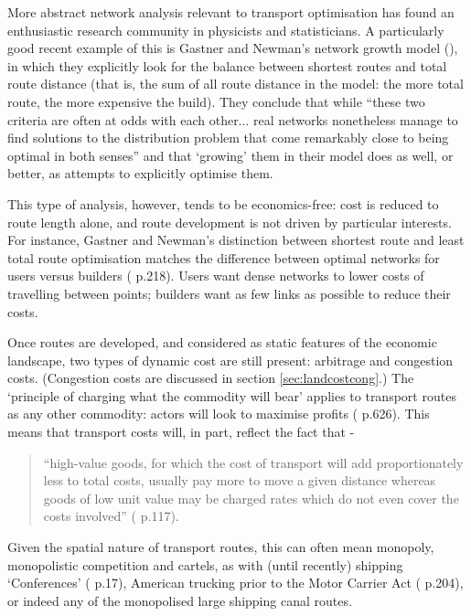 {More abstract network analysis relevant to transport optimisation has found an enthusiastic research community in physicists and statisticians. A particularly good recent example of this is Gastner and Newman's network growth model (\citealt{gastner_shape_2006}), in which they explicitly look for the balance between shortest routes and total route distance (that is, the sum of all route distance in the model: the more total route, the more expensive the build). They conclude that while ``these two criteria are often at odds with each other... real networks nonetheless manage to find solutions to the distribution problem that come remarkably close to being optimal in both senses'' and that `growing' them in their model does as well, or better, as attempts to explicitly optimise them. 

This type of analysis, however, tends to be economics-free: cost is reduced to route length alone, and route development is not driven by particular interests. For instance, Gastner and Newman's distinction between shortest route and least total route optimisation matches the difference between optimal networks for users versus builders (\citealt{haggett_locational_1977} p.218). Users want dense networks to lower costs of travelling between points; builders want as few links as possible to reduce their costs. 

Once routes are developed, and considered as static features of the economic landscape, two types of dynamic cost are still present: arbitrage and congestion costs. (Congestion costs are discussed in section \ref{sec:landcostcong}.) The `principle of charging what the commodity will bear' applies to transport routes as any other commodity: actors will look to maximise profits (\citealt{behrens_changes_2007} p.626). This means that transport costs will, in part, reflect the fact that -

\begin{quote}
``high-value goods, for which the cost of transport will add proportionately less to total costs, usually pay more to move a given distance whereas goods of low unit value may be charged rates which do not even cover the costs involved'' (\citealt{chapman_people_1979} p.117). 
\end{quote}

Given the spatial nature of transport routes, this can often mean monopoly, monopolistic competition and cartels, as with (until recently) shipping `Conferences' (\citealt{carrere_distance_2009} p.17), American trucking prior to the Motor Carrier Act (\citealt{glaeser_cities_2004} p.204), or indeed any of the monopolised large shipping canal routes.

}
